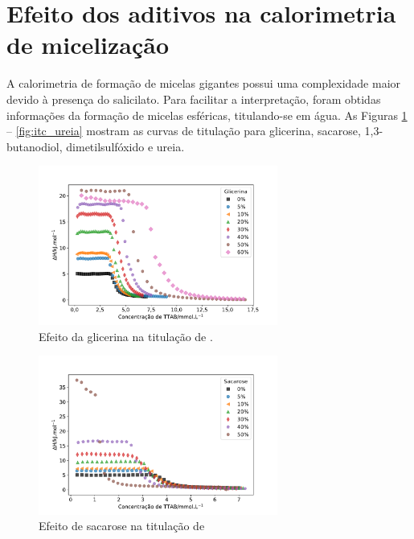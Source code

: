 		\section{Efeito dos aditivos na calorimetria de micelização}
		
		A calorimetria de formação de micelas gigantes possui uma complexidade maior devido à presença do salicilato. Para facilitar a interpretação, foram obtidas informações da formação de micelas esféricas, titulando-se \TTAB{} em água. As Figuras \ref{fig:itc_glicerina} -- \ref{fig:itc_ureia} mostram as curvas de titulação para glicerina, sacarose, 1,3-butanodiol, dimetilsulfóxido e ureia.
					
			
			\begin{figure}[h]
				\centering
				\includegraphics[width=0.7\textwidth]{imagens/itc/ITC_glic}
				\caption{Efeito da glicerina na titulação de \TTAB.}
				\label{fig:itc_glicerina}
			\end{figure}
		
			\begin{figure}[h]
				\centering
				\includegraphics[width=0.7\textwidth]{imagens/itc/ITC_sac}
				\caption{Efeito de sacarose na titulação de \TTAB}
				\label{fig:itc_sacarose}
			\end{figure}
			
